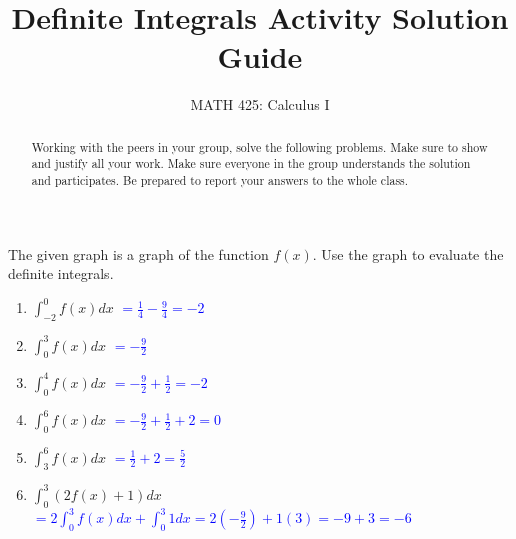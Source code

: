 \documentclass{ximera}
\title{Definite Integrals Activity Solution Guide}
\author{MATH 425: Calculus I}
\begin{document}
\begin{abstract}
   Working with the peers in your group, solve the following problems. Make sure to show and justify all your work. Make sure everyone in the group understands the solution and participates. Be prepared to report your answers to the whole class. 
\end{abstract}
\maketitle


\begin{exercise}
    The given graph is a graph of the function $f(x)$. Use the graph to evaluate the definite integrals.
    \begin{image}
    \end{image}
       \begin{enumerate}
        \item $\displaystyle \int_{-2}^{0} f(x)dx$ \textcolor{blue}{$=\frac{1}{4}-\frac{9}{4}=-2$}
        \item $ \displaystyle\int_{0}^3 f(x) dx$ \textcolor{blue}{ $=-\frac{9}{2}$}
        \item $\displaystyle\int_0^4f(x) dx$ \textcolor{blue}{ $=-\frac{9}{2}+\frac{1}{2}=-2$}
        \item $\displaystyle\int_0^6 f(x) dx$ \textcolor{blue}{ $=-\frac{9}{2}+\frac{1}{2}+2=0$}
        \item $\displaystyle\int_3^6 f(x)dx$ \textcolor{blue}{ $=\frac{1}{2}+2=\frac{5}{2}$}
        \item $\displaystyle\int_0^3 (2f(x)+1)dx$ \textcolor{blue}{ $\displaystyle =2\int_0^3f(x)dx+\int_0^3 1dx=2(-\frac{9}{2})+1(3)=-9+3=-6$}
    \end{enumerate} 
\end{exercise} 
    
\end{document}
